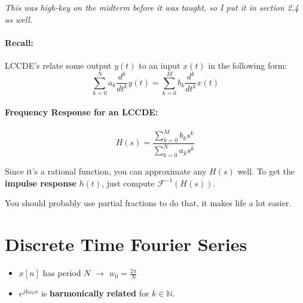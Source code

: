 \documentclass[a4paper,12pt]{report}
\begin{document}
\textit{This was high-key on the midterm before it was taught, so I put it in section 2.4 as well.} 

\paragraph{Recall: } LCCDE's relate some output $y(t)$ to an input $x(t)$ in the following form: 
\begin{equation}
\sum_{k=0}^{N} a_k \frac{d^k}{dt^k} y(t) = \sum_{k=0}^{M} b_k \frac{d^k}{dt^k} x(t)
\end{equation}

\paragraph{Frequency Response for an LCCDE: } 
\begin{equation}
H(s) = \frac{\sum_{k=0}^{M} b_k s^k}{\sum_{k=0}^{N} a_k s^k} 
\end{equation}

Since it's a rational function, you can approximate any $H(s)$ well. To get the \textbf{impulse response} $h(t)$, just compute $\mathcal{F}^{-1}(H(s))$.

You should probably use partial fractions to do that, it makes life a lot easier. 


\section{Discrete Time Fourier Series}

\begin{itemize}
\item $x[n]$ has period $N$ $\to$ $w_0 = \frac{2\pi}{N}$
\item $e^{jk\omega_0 n}$ is \textbf{harmonically related} for $k\in \mathbb{N}$.
\end{itemize}
\end{document}

